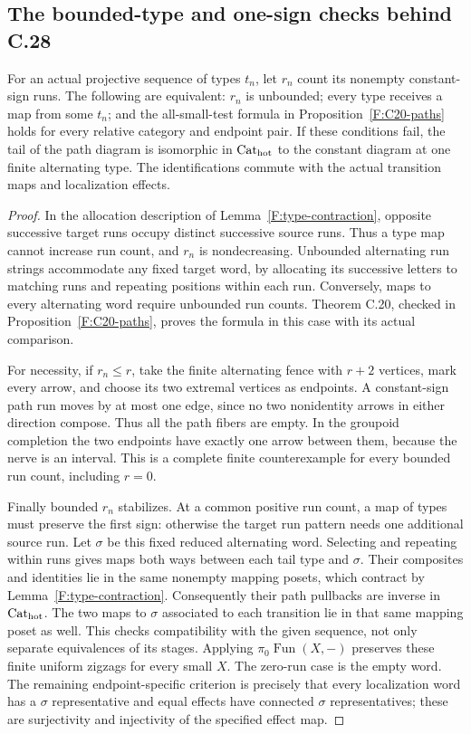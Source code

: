 \subsection{The bounded-type and one-sign checks behind C.28}
\begin{proposition}
\label{F:C21-sequences}
For an actual projective sequence of types $t_n$, let $r_n$ count
its nonempty constant-sign runs. The following are equivalent:
$r_n$ is unbounded; every type receives a map from some $t_n$;
and the all-small-test formula in Proposition~\ref{F:C20-paths}
holds for every relative category and endpoint pair.
If these conditions fail, the tail of the path diagram is
isomorphic in $\mathrm {Cat}_{\mathrm{hot}}$ to the constant diagram at
one finite alternating type. The identifications commute with
the actual transition maps and localization effects.
\end{proposition}
\begin{proof}
In the allocation description of Lemma~\ref{F:type-contraction},
opposite successive target runs occupy distinct successive source
runs. Thus a type map cannot increase run count, and $r_n$ is
nondecreasing. Unbounded alternating run strings accommodate any
fixed target word, by allocating its successive letters to matching
runs and repeating positions within each run. Conversely, maps to
every alternating word require unbounded run counts. Theorem C.20,
checked in Proposition~\ref{F:C20-paths}, proves the formula in this
case with its actual comparison.

For necessity, if $r_n\le r$, take the finite alternating fence
with $r+2$ vertices, mark every arrow, and choose its two extremal
vertices as endpoints. A constant-sign path run moves by at most
one edge, since no two nonidentity arrows in either direction
compose. Thus all the path fibers are empty. In the groupoid
completion the two endpoints have exactly one arrow between them,
because the nerve is an interval. This is a complete finite
counterexample for every bounded run count, including $r=0$.

Finally bounded $r_n$ stabilizes. At a common positive run count,
a map of types must preserve the first sign: otherwise the target
run pattern needs one additional source run. Let $\sigma$ be this
fixed reduced alternating word. Selecting and repeating within
runs gives maps both ways between each tail type and $\sigma$.
Their composites and identities lie in the same nonempty mapping
posets, which contract by Lemma~\ref{F:type-contraction}.
Consequently their path pullbacks are inverse in
$\mathrm {Cat}_{\mathrm{hot}}$. The two maps to $\sigma$ associated to
each transition lie in that same mapping poset as well. This
checks compatibility with the given sequence, not only separate
equivalences of its stages. Applying
$\pi_0\operatorname{Fun}(X,-)$ preserves these finite uniform
zigzags for every small $X$. The zero-run case is the empty word.
The remaining endpoint-specific criterion is precisely that
every localization word has a $\sigma$ representative and equal
effects have connected $\sigma$ representatives; these are
surjectivity and injectivity of the specified effect map.
\end{proof}

